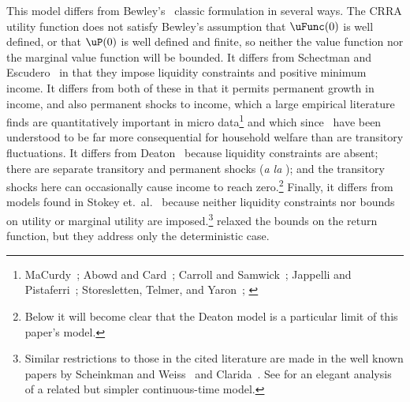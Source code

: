 \documentclass[BufferStockTheory]{subfiles}
\begin{document}
\begin{comment}
  Combining the transition equations, the recursive nature of
  the problem allows us to rewrite it more compactly in Bellman equation form,
  \begin{align*}
    \VFunc_{t}(\mLevBF_{t},\pLevBF_{t})  & = \max_{\cLevBF_{t}}~\left\{\uFunc(\cLevBF_{t})+\DiscFac \Ex_{t}\left[ \VFunc_{t+1}((\mLevBF_{t}-\cLevBF_{t})\Rfree+ \pLevBF_{t+1}\tShkAll_{t+1},\pLevBF_{t} \PGro  \pShk_{t+1})\right]\right\}
                                           .
  \end{align*}
\end{comment}

\hypertarget{DiffWithLit}{} This model differs from Bewley's~\citeyearpar{bewleyPIH} classic formulation in several ways. The CRRA utility function does not satisfy Bewley's assumption that $\uFunc(0)$ is well defined, or that $\uP(0)$ is well defined and finite, so neither the value function nor the marginal value function will be bounded.  It differs from Schectman and Escudero~\citeyearpar{seIncFluct} in that they impose liquidity constraints and positive minimum income.  It differs from both of these in that it permits permanent growth in income, and also permanent shocks to income, which a large empirical literature finds are quantitatively important in micro data\footnote{MaCurdy~\citeyearpar{macurdyTimeseries}; Abowd and Card~\citeyearpar{acCovariance}; Carroll and Samwick~\citeyearpar{csNature}; Jappelli and Pistaferri~\citeyearpar{jpCins}; Storesletten, Telmer, and Yaron~\citeyearpar{styConsumption}; \cite{blpRisk}} and which since~\cite{friedmanATheory} have been understood to be far more consequential for household welfare than are transitory fluctuations.  It differs from Deaton~\citeyearpar{deatonLiqConstr} because liquidity constraints are absent; there are separate transitory and permanent shocks ({\it a la} \cite{muthOptimal}); and the transitory shocks here can occasionally cause income to reach zero.\footnote{Below it will become clear that the Deaton model is a particular limit of this paper's model.}  Finally, it differs from models found in Stokey et.\ al.~\citeyearpar{slpMethods} because neither liquidity constraints nor bounds on utility or marginal utility are imposed.\footnote{Similar restrictions to those in the cited literature are made in the well known papers by Scheinkman and Weiss~\citeyearpar{scheinkman&weiss:borrowing} and Clarida~\citeyearpar{claridaErgodic}.  See \cite{tocheUrisk} for an elegant analysis of a related but simpler continuous-time model.}  \cite{asHomogeneous} relaxed the bounds on the return function, but they address only the deterministic case.
\end{document}
